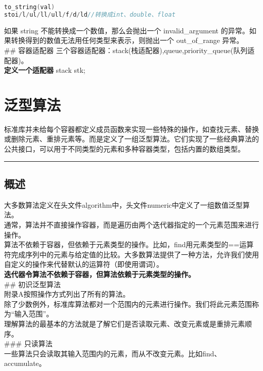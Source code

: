 \documentclass[
  a4paper,
  oneside,tablecaptionabove
]{scrbook}
\begin{document}
\begin{lstlisting}[language={C++}]
to_string(val)
stoi/l/ul/ll/ull/f/d/ld//转换成int、double、float
\end{lstlisting}

如果 string 不能转换成一个数值，那么会抛出一个 invalid\_argument
的异常。如果转换得到的数值无法用任何类型来表示，则抛出一个
out\_of\_range 异常。\\
\#\# 容器适配器
三个容器适配器：stack(栈适配器),queue,priority\_queue(队列适配器)。\\
\textbf{定义一个适配器} stack stk;

\chapter{泛型算法}\label{ux6cdbux578bux7b97ux6cd5}

标准库并未给每个容器都定义成员函数来实现一些特殊的操作，如查找元素、替换或删除元素、重排元素等。而是定义了一组泛型算法。它们实现了一些经典算法的公共接口，可以用于不同类型的元素和多种容器类型，包括内置的数组类型。

\begin{center}\rule{0.5\linewidth}{\linethickness}\end{center}

\section{概述}\label{ux6982ux8ff0}

大多数算法定义在头文件algorithm中，头文件numeric中定义了一组数值泛型算法。\\
通常，算法并不直接操作容器，而是遍历由两个迭代器指定的一个元素范围来进行操作。\\
算法不依赖于容器，但依赖于元素类型的操作。比如，find用元素类型的==运算符完成序列中的元素与给定值的比较。大多数算法提供了一种方法，允许我们使用自定义的操作来代替默认的运算符（即使用谓词）。\\
\textbf{迭代器令算法不依赖于容器，但算法依赖于元素类型的操作。}\\
\#\# 初识泛型算法\\
附录A按照操作方式列出了所有的算法。\\
除了少数例外，标准库算法都对一个范围内的元素进行操作。我们将此元素范围称为\enquote{输入范围}。\\
理解算法的最基本的方法就是了解它们是否读取元素、改变元素或是重排元素顺序。\\
\#\#\# 只读算法\\
一些算法只会读取其输入范围内的元素，而从不改变元素。比如find、accumulate。
\end{document}
